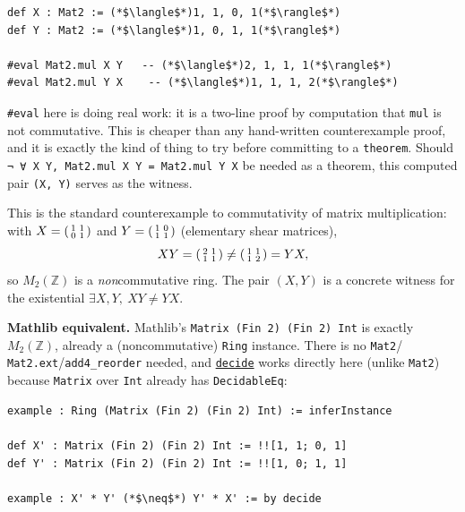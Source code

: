 \begin{lstlisting}
def X : Mat2 := (*$\langle$*)1, 1, 0, 1(*$\rangle$*)
def Y : Mat2 := (*$\langle$*)1, 0, 1, 1(*$\rangle$*)

#eval Mat2.mul X Y   -- (*$\langle$*)2, 1, 1, 1(*$\rangle$*)
#eval Mat2.mul Y X    -- (*$\langle$*)1, 1, 1, 2(*$\rangle$*)
\end{lstlisting}

\texttt{\#eval} here is doing real work: it is a two-line proof by computation that \texttt{mul} is not commutative. This is cheaper than any hand-written counterexample proof, and it is exactly the kind of thing to try before committing to a \texttt{theorem}. Should \texttt{¬ ∀ X Y, Mat2.mul X Y = Mat2.mul Y X} be needed as a theorem, this computed pair \texttt{(X, Y)} serves as the witness.

\begin{mathreading}

This is the standard counterexample to commutativity of matrix multiplication: with \(X =
\begin{psmallmatrix}1&1\\0&1\end{psmallmatrix}\) and \(Y =
\begin{psmallmatrix}1&0\\1&1\end{psmallmatrix}\) (elementary shear matrices), \[
XY = \begin{psmallmatrix}2&1\\1&1\end{psmallmatrix} \neq
\begin{psmallmatrix}1&1\\1&2\end{psmallmatrix} = YX,
\] so \(M_2(\mathbb{Z})\) is a \emph{non}commutative ring. The pair \((X, Y)\) is a concrete witness for the existential \(\exists X, Y,\ XY \neq YX\).

\end{mathreading}

\textbf{Mathlib equivalent.} Mathlib's \texttt{Matrix (Fin 2) (Fin 2) Int} is exactly \(M_2(\mathbb{Z})\), already a (noncommutative) \texttt{Ring} instance. There is no \texttt{Mat2}/ \texttt{Mat2.ext}/\texttt{add4\_\allowbreak{}reorder} needed, and \href{https://lean-lang.org/doc/reference/latest/Tactic-Proofs/Tactic-Reference/}{\texttt{decide}} works directly here (unlike \texttt{Mat2}) because \texttt{Matrix} over \texttt{Int} already has \texttt{DecidableEq}:

\begin{lstlisting}
example : Ring (Matrix (Fin 2) (Fin 2) Int) := inferInstance

def X' : Matrix (Fin 2) (Fin 2) Int := !![1, 1; 0, 1]
def Y' : Matrix (Fin 2) (Fin 2) Int := !![1, 0; 1, 1]

example : X' * Y' (*$\neq$*) Y' * X' := by decide
\end{lstlisting}

